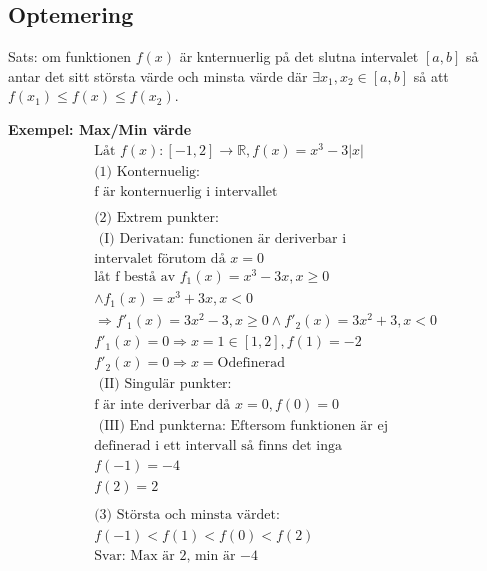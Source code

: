 \newpage
\begin{multicols}{2}
\section{Optemering}
Sats: om funktionen $f(x)$ är knternuerlig på det slutna intervalet $[a,b]$
så antar det sitt största värde och minsta värde där $\exists x_1,x_2\in[a,b]$
så att $f(x_1) \leq f(x) \leq f(x_2)$.


\textbf{Exempel: Max/Min värde}
\begin{align*}
  &\text{Låt } f(x):[-1,2]\to\mathbb{R}, f(x)=x^3-3|x|  \\
  &\text{(1) Konternuelig: } \\
  &\text{f är konternuerlig i intervallet}   \\
  &\\
  &\text{(2) Extrem punkter: }   \\
  &\text{ (I) Derivatan: functionen är deriverbar i} \\
  &\text{intervalet förutom då } x=0 \\
  &\text{låt f bestå av } f_1(x)=x^3-3x, x \geq 0 \\ 
  &\land f_1(x)=x^3+3x, x<0 \\
  &\Rightarrow f'_1(x)=3x^2-3, x \geq 0 \land f'_2(x)=3x^2+3, x<0 \\
  & f'_1(x)=0 \Rightarrow x=1 \in [1,2], f(1)=-2  \\
  & f'_2(x)=0 \Rightarrow x= \text{Odefinerad} \\
  &\text{ (II) Singulär punkter:} \\
  &\text{f är inte deriverbar då } x=0, f(0)=0 \\
  &\text{ (III) End punkterna: Eftersom funktionen är ej} \\
  &\text{definerad i ett intervall så finns det inga } \\
  &f(-1)=-4 \\
  &f(2) = 2 \\
  &\\
  &\text{(3) Största och minsta värdet: } \\
  &f(-1)<f(1)<f(0)<f(2)  \\
  &\text{Svar: Max är $2$, min är $-4$}  \\
\end{align*}



\end{multicols}
